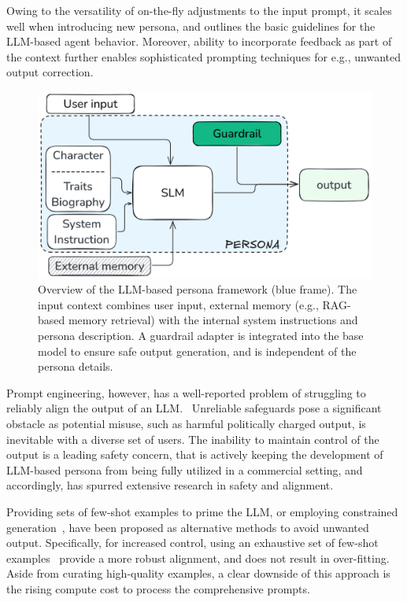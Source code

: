 \documentclass[letterpaper]{article}
\begin{document}
Owing to the versatility of on-the-fly adjustments to the input prompt, it scales well when introducing new persona, and outlines the basic guidelines for the LLM-based agent behavior.
Moreover, ability to incorporate feedback as part of the context further enables sophisticated prompting techniques for e.g., unwanted output correction.~\cite{schulhoff2024prompt}
\begin{figure}
	\centering
	\includegraphics[width=1.0\linewidth]{figures/introductionDiagram.png}
	\caption{Overview of the LLM-based persona framework (blue frame). The input context combines user input, external memory (e.g., RAG-based memory retrieval) with the internal system instructions and persona description. A guardrail adapter is integrated into the base model to ensure safe output generation, and is independent of the persona details.}\label{fig:introduction-diagram}
\end{figure}
Prompt engineering, however, has a well-reported problem of struggling to reliably align the output of an LLM.~\cite{bhargava2023s, cao2024worst}  
Unreliable safeguards pose a significant obstacle as potential misuse, such as harmful politically charged output, is inevitable with a diverse set of users.
The inability to maintain control of the output is a leading safety concern, that is actively keeping the development of LLM-based persona from being fully utilized in a commercial setting, and accordingly, has spurred extensive research in safety and alignment.~\cite{ghosh2024aegis,zeng2024shieldgemma,han2024wildguard,inan2023llama}

Providing sets of few-shot examples to prime the LLM, or employing constrained generation~\cite{loulasyntactic, zhao2024probabilistic, lew2023sequential}, have been proposed as alternative methods to avoid unwanted output. Specifically, for increased control, using an exhaustive set of few-shot examples~\cite{agarwal2024many} provide a more robust alignment, and does not result in over-fitting. 
Aside from curating high-quality examples, a clear downside of this approach is the rising compute cost to process the comprehensive prompts.
\end{document}
